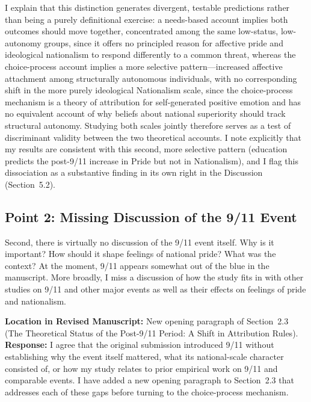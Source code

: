 \documentclass[11pt]{article}
\begin{document}
I explain that this distinction generates divergent, testable predictions rather than being a purely definitional exercise: a needs-based account implies both outcomes should move together, concentrated among the same low-status, low-autonomy groups, since it offers no principled reason for affective pride and ideological nationalism to respond differently to a common threat, whereas the choice-process account implies a more selective pattern---increased affective attachment among structurally autonomous individuals, with no corresponding shift in the more purely ideological Nationalism scale, since the choice-process mechanism is a theory of attribution for self-generated positive emotion and has no equivalent account of why beliefs about national superiority should track structural autonomy. Studying both scales jointly therefore serves as a test of discriminant validity between the two theoretical accounts. I note explicitly that my results are consistent with this second, more selective pattern (education predicts the post-9/11 increase in Pride but not in Nationalism), and I flag this dissociation as a substantive finding in its own right in the Discussion (Section~5.2).

\subsection*{Point 2: Missing Discussion of the 9/11 Event}

\begin{reviewercomment}
Second, there is virtually no discussion of the 9/11 event itself. Why is it important? How should it shape feelings of national pride? What was the context? At the moment, 9/11 appears somewhat out of the blue in the manuscript. More broadly, I miss a discussion of how the study fits in with other studies on 9/11 and other major events as well as their effects on feelings of pride and nationalism.
\end{reviewercomment}

\noindent\textbf{Location in Revised Manuscript:} New opening paragraph of Section~2.3 (The Theoretical Status of the Post-9/11 Period: A Shift in Attribution Rules).\\[4pt]
\textbf{Response:} I agree that the original submission introduced 9/11 without establishing why the event itself mattered, what its national-scale character consisted of, or how my study relates to prior empirical work on 9/11 and comparable events. I have added a new opening paragraph to Section~2.3 that addresses each of these gaps before turning to the choice-process mechanism.
\end{document}
